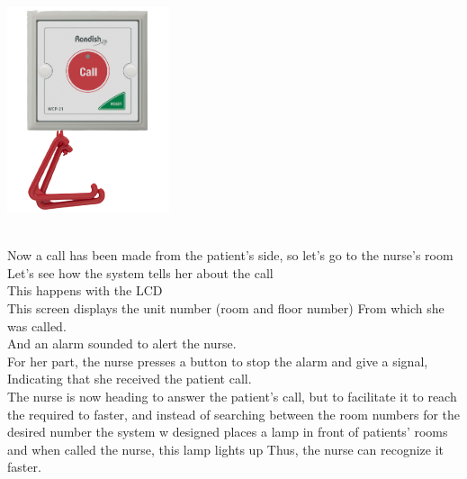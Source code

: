 \documentclass[12pt,fleqn]{book} %
\begin{document}
\begin{itemize}
\begin{minipage}{0.3\textwidth}
\includegraphics[width=\linewidth]{nurse call 7.png}
\end{minipage}
\end{itemize}
\\ Now a call has been made from the patient's side, so let's go to the nurse's room
\\ Let's see how the system tells her about the call
\\ This happens with the LCD
\\ This screen displays the unit number (room and floor number) From which she was called.
\\ And an alarm sounded to alert the nurse.
\\ For her part, the nurse presses a button to stop the alarm and give a signal, Indicating that she received the patient call.
\\ The nurse is now heading to answer the patient's call, but to facilitate it to reach the required to faster, and instead of searching between the room numbers for the desired number the system w designed places a lamp in front of patients' rooms and when called the nurse, this lamp lights up Thus, the nurse can recognize it faster.
\end{document}
